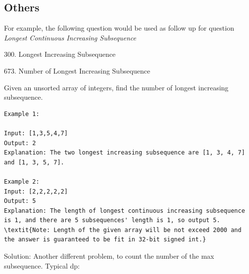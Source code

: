 \documentclass[../../../main.tex]{subfiles}
\begin{document}

\subsection{Others}
For example, the following question would be used as follow up for question \textit{Longest Continuous Increasing Subsequence}

300. Longest Increasing Subsequence


673. Number of Longest Increasing Subsequence

Given an unsorted array of integers, find the number of longest increasing subsequence.
\begin{lstlisting}
Example 1:

Input: [1,3,5,4,7]
Output: 2
Explanation: The two longest increasing subsequence are [1, 3, 4, 7] and [1, 3, 5, 7].

Example 2:
Input: [2,2,2,2,2]
Output: 5
Explanation: The length of longest continuous increasing subsequence is 1, and there are 5 subsequences' length is 1, so output 5.
\textit{Note: Length of the given array will be not exceed 2000 and the answer is guaranteed to be fit in 32-bit signed int.}
\end{lstlisting}

Solution: Another different problem, to count the number of the max subsequence. Typical dp:
\end{document}

